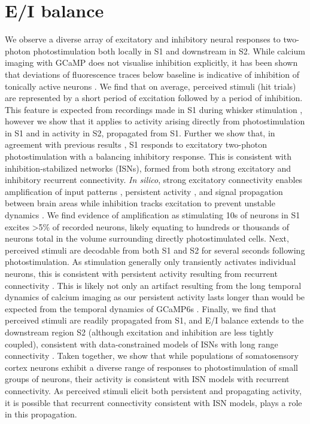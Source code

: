 \section{E/I balance}
We observe a diverse array of excitatory and inhibitory neural responses to two-photon photostimulation both locally in S1 and downstream in S2. While calcium imaging with GCaMP does not visualise inhibition explicitly, it has been shown that deviations of fluorescence traces below baseline is indicative of inhibition of tonically active neurons \cite{vanwalleghem_calcium_2021}. We find that on average, perceived stimuli (hit trials) are represented by a short period of excitation followed by a period of inhibition. This feature is expected from recordings made in S1 during whisker stimulation \cite{gabernet_somatosensory_2005, wilent_dynamics_2005}, however we show that it applies to activity arising directly from photostimulation in S1 and in activity in S2, propagated from S1.  Further we show that, in agreement with previous results \cite{dalgleish_how_2020}, S1 responds to excitatory two-photon photostimulation with a balancing inhibitory response. This is consistent with inhibition-stabilized networks (ISNs), formed from both strong excitatory and inhibitory recurrent connectivity. \textit{In silico}, strong excitatory connectivity enables amplification of input patterns \cite{murphy_balanced_2009}, persistent activity \cite{amit_model_1997}, and signal propagation between brain areas \cite{joglekar_inter-areal_2018} while inhibition tracks excitation to prevent unstable dynamics \cite{sanzeni_inhibition_2020}. We find evidence of amplification as stimulating 10s of neurons in S1 excites >5\% of recorded neurons, likely equating to hundreds or thousands of neurons total in the volume surrounding directly photostimulated cells. Next, perceived stimuli are decodable from both S1 and S2 for several seconds following photostimulation. As stimulation generally only transiently activates individual neurons, this is consistent with persistent activity resulting from recurrent connectivity \cite{daie_targeted_2021, seung_how_1996}. This is likely not only an artifact resulting from the long temporal dynamics of calcium imaging as our persistent activity lasts longer than would be expected from the temporal dynamics of GCaMP6s \cite{daie_targeted_2021, chen_ultrasensitive_2013}. Finally, we find that perceived stimuli are readily propagated from S1, and E/I balance extends to the downstream region S2 (although excitation and inhibition are less tightly coupled), consistent with data-constrained models of ISNs with long range connectivity \cite{joglekar_inter-areal_2018}. Taken together, we show that while populations of somatosensory cortex neurons exhibit a diverse range of responses to photostimulation of small groups of neurons, their activity is consistent with ISN models with recurrent connectivity. As perceived stimuli elicit both persistent and propagating activity, it is possible that recurrent connectivity consistent with ISN models, plays a role in this propagation.

